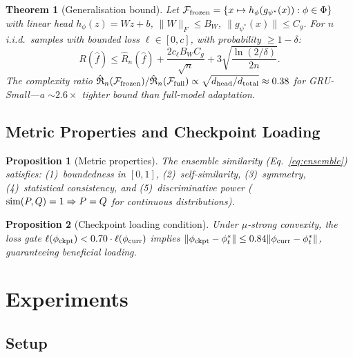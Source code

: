 \documentclass[journal]{IEEEtran}
\newtheorem{proposition}{Proposition}
\newtheorem{theorem}{Theorem}
\begin{document}
\begin{theorem}[Generalisation bound]
\label{thm:generalization}
Let $\mathcal{F}_{\textup{frozen}} = \{x \mapsto h_\phi(g_{\psi^*}(x)) : \phi \in \Phi\}$ with linear head $h_\phi(z) = Wz + b$, $\|W\|_F \leq B_W$, $\|g_{\psi^*}(x)\| \leq C_g$. For $n$ i.i.d.\ samples with bounded loss $\ell \in [0, c]$, with probability $\geq 1-\delta$:
\begin{equation}
    R(\hat{f}) \leq \hat{R}_n(\hat{f}) + \frac{2 c_\ell B_W C_g}{\sqrt{n}} + 3\sqrt{\frac{\ln(2/\delta)}{2n}}.
    \label{eq:gen_bound}
\end{equation}
The complexity ratio $\hat{\mathfrak{R}}_n(\mathcal{F}_{\textup{frozen}}) / \hat{\mathfrak{R}}_n(\mathcal{F}_{\textup{full}}) \propto \sqrt{d_{\textup{head}}/d_{\textup{total}}} \approx 0.38$ for GRU-Small---a ${\sim}2.6\times$ tighter bound than full-model adaptation.
\end{theorem}

\subsection{Metric Properties and Checkpoint Loading}

\begin{proposition}[Metric properties]
\label{prop:metric}
The ensemble similarity (Eq.~\ref{eq:ensemble}) satisfies: (1)~boundedness in $[0,1]$, (2)~self-similarity, (3)~symmetry, (4)~statistical consistency, and (5)~discriminative power ($\textup{sim}(P,Q) = 1 \Rightarrow P = Q$ for continuous distributions).
\end{proposition}

\begin{proposition}[Checkpoint loading condition]
\label{prop:loading}
Under $\mu$-strong convexity, the loss gate $\ell(\phi_{\textup{ckpt}}) < 0.70 \cdot \ell(\phi_{\textup{curr}})$ implies $\|\phi_{\textup{ckpt}} - \phi^*_t\| \leq 0.84\|\phi_{\textup{curr}} - \phi^*_t\|$, guaranteeing beneficial loading.
\end{proposition}


\section{Experiments}
\label{sec:experiments}

\subsection{Setup}
\end{document}
